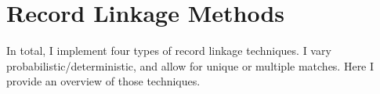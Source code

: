\documentclass[12pt]{article}
\begin{document}



\section{Record Linkage Methods}
In total, I implement four types of record linkage techniques. I vary probabilistic/deterministic, and allow for unique or multiple matches.  Here I provide an overview of those techniques. 
\end{document}
